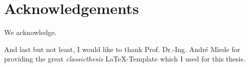 

\bigskip


\begingroup

\let\clearpage\relax
\let\cleardoublepage\relax
\let\cleardoublepage\relax

\chapter*{Acknowledgements} %

We acknowledge.

And last but not least, I would like to thank Prof. Dr.-Ing. André Miede for
providing the great \emph{classicthesis} \LaTeX-Template which I used for this
thesis.

\endgroup
